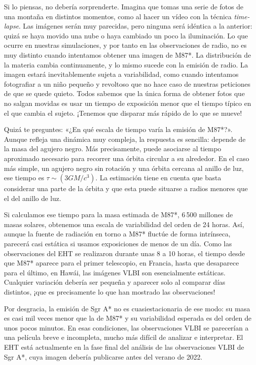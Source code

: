 Si lo piensas, no debería sorprenderte. Imagina que tomas una serie de fotos de una montaña en distintos momentos, como al hacer un vídeo con la técnica \emph{time-lapse}. Las imágenes serán muy parecidas, pero ninguna será idéntica a la anterior: quizá se haya movido una nube o haya cambiado un poco la iluminación. Lo que ocurre en nuestras simulaciones, y por tanto en las observaciones de radio, no es muy distinto cuando intentamos obtener una imagen de M87*. La distribución de la materia cambia continuamente, y lo mismo sucede con la emisión de radio. La imagen estará inevitablemente sujeta a variabilidad, como cuando intentamos fotografiar a un niño pequeño y revoltoso que no hace caso de nuestras peticiones de que se quede quieto. Todos sabemos que la única forma de obtener fotos que no salgan movidas es usar un tiempo de exposición menor que el tiempo típico en el que cambia el sujeto. ¡Tenemos que disparar más rápido de lo que se mueve!

Quizá te preguntes: «¿En qué escala de tiempo varía la emisión de M87*?». Aunque refleja una dinámica muy compleja, la respuesta es sencilla: depende de la masa del agujero negro. Más precisamente, puede asociarse al tiempo aproximado necesario para recorrer una órbita circular a su alrededor. En el caso más simple, un agujero negro sin rotación y una órbita cercana al anillo de luz, ese tiempo es \(\tau\sim(3GM/c^{3})\). La estimación tiene en cuenta que basta considerar una parte de la órbita y que esta puede situarse a radios menores que el del anillo de luz.

Si calculamos ese tiempo para la masa estimada de M87*, 6\,500 millones de masas solares, obtenemos una escala de variabilidad del orden de 24 horas. Así, aunque la fuente de radiación en torno a M87* fluctúe de forma intrínseca, parecerá casi estática si usamos exposiciones de menos de un día. Como las observaciones del EHT se realizaron durante unas 8 a 10 horas, el tiempo desde que M87* aparece para el primer telescopio, en Francia, hasta que desaparece para el último, en Hawái, las imágenes VLBI son esencialmente estáticas. Cualquier variación debería ser pequeña y aparecer solo al comparar días distintos, ¡que es precisamente lo que han mostrado las observaciones!

Por desgracia, la emisión de Sgr A* no es cuasiestacionaria de ese modo: su masa es casi mil veces menor que la de M87* y su variabilidad esperada es del orden de unos pocos minutos. En esas condiciones, las observaciones VLBI se parecerían a una película breve e incompleta, mucho más difícil de analizar e interpretar. El EHT está actualmente en la fase final del análisis de las observaciones VLBI de Sgr A*, cuya imagen debería publicarse antes del verano de 2022.

